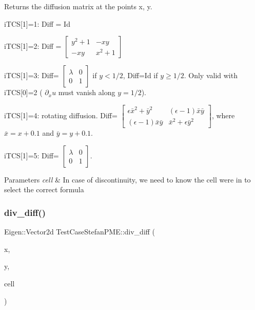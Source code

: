 Returns the diffusion matrix at the points x, y. 

i\+T\+CS\mbox{[}1\mbox{]}=1\+: Diff = Id

i\+T\+CS\mbox{[}1\mbox{]}=2\+: Diff = $\left[\begin{array}{cc}y^2+1 & -xy\\ -xy & x^2+1\end{array}\right]$

i\+T\+CS\mbox{[}1\mbox{]}=3\+: Diff= $\left[\begin{array}{cc}\lambda & 0\\ 0 & 1\end{array}\right]$ if $y<1/2$, Diff=Id if $y\ge 1/2$. Only valid with i\+T\+CS\mbox{[}0\mbox{]}=2 ( $\partial_x u$ must vanish along $y=1/2$).

i\+T\+CS\mbox{[}1\mbox{]}=4\+: rotating diffusion. Diff= $\left[\begin{array}{cc}\epsilon \bar{x}^2 + \bar{y}^2 & (\epsilon-1)\bar{x}\bar{y}\\ (\epsilon-1)\bar{x}\bar{y} & \bar{x}^2+\epsilon \bar{y}^2\end{array}\right]$, where $\bar{x}=x+0.1$ and $\bar{y}=y+0.1$.

i\+T\+CS\mbox{[}1\mbox{]}=5\+: Diff= $\left[\begin{array}{cc}\lambda & 0\\ 0 & 1\end{array}\right]$. 
\begin{DoxyParams}{Parameters}
{\em cell} & In case of discontinuity, we need to know the cell we\textquotesingle{}re in to select the correct formula \\
\hline
\end{DoxyParams}
\mbox{\label{classTestCaseStefanPME_a8c85fa8375fbc6c42461dd4562d53ce3}} 
\subsubsection{\texorpdfstring{div\+\_\+diff()}{div\_diff()}}
{\footnotesize\ttfamily Eigen\+::\+Vector2d Test\+Case\+Stefan\+P\+M\+E\+::div\+\_\+diff (\begin{DoxyParamCaption}\item[{const double}]{x,  }\item[{const double}]{y,  }\item[{const \hyperlink{classHArDCore2D_1_1Cell}{Cell} $\ast$}]{cell }\end{DoxyParamCaption})}



